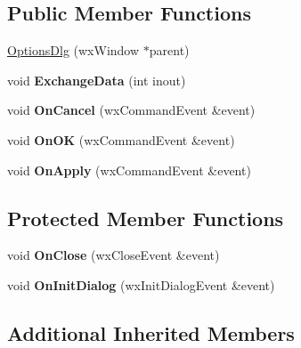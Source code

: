 \subsection*{Public Member Functions}
\begin{DoxyCompactItemize}
\item 
\hyperlink{class_options_dlg_a40a392346d152d4b9e37e54bcf2cb40a}{Options\-Dlg} (wx\-Window $\ast$parent)
\item 
\hypertarget{class_options_dlg_a0adae9a9eccd2e5ed64cbec046ca2308}{void {\bfseries Exchange\-Data} (int inout)}\label{class_options_dlg_a0adae9a9eccd2e5ed64cbec046ca2308}

\item 
\hypertarget{class_options_dlg_a54a747951dc77b99fe3948ccce391182}{void {\bfseries On\-Cancel} (wx\-Command\-Event \&event)}\label{class_options_dlg_a54a747951dc77b99fe3948ccce391182}

\item 
\hypertarget{class_options_dlg_ac7953e83f9414f07a200f81279db079e}{void {\bfseries On\-O\-K} (wx\-Command\-Event \&event)}\label{class_options_dlg_ac7953e83f9414f07a200f81279db079e}

\item 
\hypertarget{class_options_dlg_a3c0ded9050e9dc1ffbd8c65977852bc3}{void {\bfseries On\-Apply} (wx\-Command\-Event \&event)}\label{class_options_dlg_a3c0ded9050e9dc1ffbd8c65977852bc3}

\end{DoxyCompactItemize}
\subsection*{Protected Member Functions}
\begin{DoxyCompactItemize}
\item 
\hypertarget{class_options_dlg_adfc306dd1752dc33edbfb155e446e29b}{void {\bfseries On\-Close} (wx\-Close\-Event \&event)}\label{class_options_dlg_adfc306dd1752dc33edbfb155e446e29b}

\item 
\hypertarget{class_options_dlg_a955c09ba654830aae49fa44221fe92a9}{void {\bfseries On\-Init\-Dialog} (wx\-Init\-Dialog\-Event \&event)}\label{class_options_dlg_a955c09ba654830aae49fa44221fe92a9}

\end{DoxyCompactItemize}
\subsection*{Additional Inherited Members}


